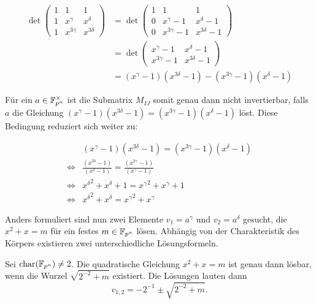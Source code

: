 \begin{align*}
    \det \begin{pmatrix}
        1 & 1 & 1 \\
        1 & x^{\gamma} & x^{\delta} \\
        1 & x^{3\gamma} & x^{3\delta}
    \end{pmatrix}
    &= \det \begin{pmatrix}
        1 & 1 & 1 \\
        0 & x^{\gamma} -1 & x^{\delta} -1 \\
        0 & x^{3\gamma} -1 & x^{3\delta} -1
    \end{pmatrix} \\
    &= \det \begin{pmatrix}
        x^{\gamma} -1 & x^{\delta} -1 \\
        x^{3\gamma} -1 & x^{3\delta} -1
    \end{pmatrix} \\
    &= (x^{\gamma} -1)(x^{3\delta} -1) - (x^{3\gamma} -1)(x^{\delta} -1)
\end{align*}

Für ein $a \in \field{p}[n]^\times$ ist die Submatrix $M_{IJ}$ somit genau dann nicht invertierbar, falls $a$ die Gleichung $(x^{\gamma} -1)(x^{3\delta} -1) = (x^{3\gamma} -1)(x^{\delta} -1)$ löst. Diese Bedingung reduziert sich weiter zu:

\begin{align}
        & (x^{\gamma} -1)(x^{3\delta} -1) = (x^{3\gamma} -1)(x^{\delta} -1) \nonumber \\
    \iff & \frac{(x^{3\delta} -1)}{(x^{\delta} -1)} = \frac{(x^{3\gamma} -1)}{(x^{\gamma} -1)} \nonumber \\
    \iff & {x^\delta}^2 + x^{\delta} + 1 = {x^{\gamma}}^2 + x^{\gamma} + 1 \nonumber \\
    \iff & {x^\delta}^2 + x^{\delta} = {x^{\gamma}}^2 + x^{\gamma} \label{equation:013}
\end{align}

Anders formuliert sind nun zwei Elemente $v_1 = a^\gamma$ und $v_2 = a^\delta$ gesucht, die $x^2 + x = m$ für ein festes $m \in \field{p}[n]$ lösen. Abhängig von der Charakteristik des Körpers existieren zwei unterschiedliche Lösungsformeln.

\begin{lemma}
    Sei $\charac(\field{p}[n]) \neq 2$. Die quadratische Gleichung $x^2 + x = m$ ist genau dann lösbar, wenn die Wurzel $\sqrt{2^{-2} + m}$ existiert. Die Lösungen lauten dann
    \begin{equation*}
        v_{1,2} = -2^{-1} \pm \sqrt{2^{-2} + m}.
    \end{equation*}
\end{lemma}

